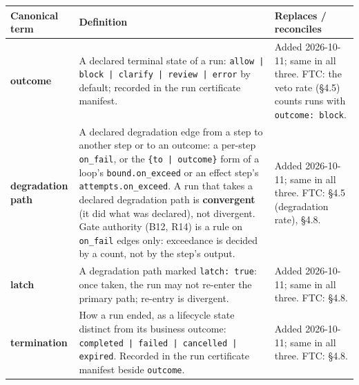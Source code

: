 \documentclass[11pt]{article}
\newcommand{\code}[1]{\texttt{#1}}
\begin{document}
\begin{center}
\footnotesize
\begin{tabular}{@{}p{2.7cm} p{7.1cm} p{5.6cm}@{}}
\toprule
\textbf{Canonical term} & \textbf{Definition} & \textbf{Replaces / reconciles} \\
\midrule
\textbf{outcome} & A declared terminal state of a run: \code{allow | block | clarify | review | error} by default; recorded in the run certificate manifest. & Added 2026-10-11; same in all three. FTC: the veto rate (\S4.5) counts runs with \code{outcome: block}. \\
\addlinespace
\textbf{degradation path} & A declared degradation edge from a step to another step or to an outcome: a per-step \code{on\_fail}, or the \code{\{to | outcome\}} form of a loop's \code{bound.on\_exceed} or an effect step's \code{attempts.on\_exceed}. A run that takes a declared degradation path is \textbf{convergent} (it did what was declared), not divergent. Gate authority (B12, R14) is a rule on \code{on\_fail} edges only: exceedance is decided by a count, not by the step's output. & Added 2026-10-11; same in all three. FTC: \S4.5 (degradation rate), \S4.8. \\
\addlinespace
\textbf{latch} & A degradation path marked \code{latch: true}: once taken, the run may not re-enter the primary path; re-entry is divergent. & Added 2026-10-11; same in all three. FTC: \S4.8. \\
\addlinespace
\textbf{termination} & How a run ended, as a lifecycle state distinct from its business outcome: \code{completed | failed | cancelled | expired}. Recorded in the run certificate manifest beside \code{outcome}. & Added 2026-10-11; same in all three. FTC: \S4.8. \\
\bottomrule
\end{tabular}
\end{center}
\end{document}
